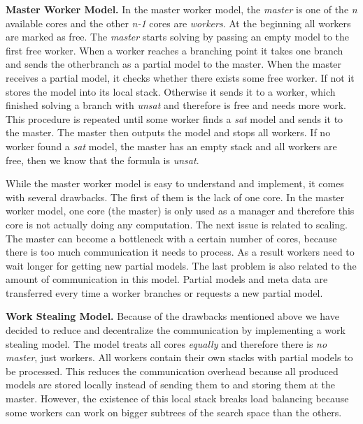 \documentclass[letterpaper]{article}
\newcommand{\mypar}[1]{{\bf #1.}}
\begin{document}
\mypar{Master Worker Model}
In the master worker model, the \textit{master} is one of the \textit{n} available cores and the other \textit{n-1} cores are \textit{workers}.
At the beginning all workers are marked as free.
The \textit{master} starts solving by passing an empty model to the first free worker.
When a worker reaches a branching point it takes one branch and sends the other\linebreak branch as a partial model to the master.
When the master receives a partial model, it checks whether there exists some free worker.
If not it stores the model into its local stack.
Otherwise it sends it to a worker, which finished solving a branch with \textit{unsat} and therefore is free and needs more work.
This procedure is repeated until some worker finds a \textit{sat} model and sends it to the master.
The master then outputs the model and stops all workers.
If no worker found a \textit{sat} model, the master has an empty stack and all workers are free, then we know that the formula is \textit{unsat}.

While the master worker model is easy to understand and implement, it comes with several drawbacks.
The first of them is the lack of one core.
In the master worker model, one core (the master) is only used as a manager and therefore this core is not actually doing any computation.
The next issue is related to scaling.
The master can become a bottleneck with a certain number of cores, because there is too much communication it needs to process.
As a result workers need to wait longer for getting new partial models.
The last problem is also related to the amount of communication in this model.
Partial models and meta data are transferred every time a worker branches or requests a new partial model.

\mypar{Work Stealing Model}
Because of the drawbacks mentioned above we have decided to reduce and decentralize the communication by implementing a work stealing model.
The model treats all cores \textit{equally} and therefore there is \textit{no master}, just workers.
All workers contain their own stacks with partial models to be processed.
This reduces the communication overhead because all produced models are stored locally instead of sending them to and storing them at the master.
However, the existence of this local stack breaks load balancing because some workers can work on bigger subtrees of the search space than the others.
\end{document}
